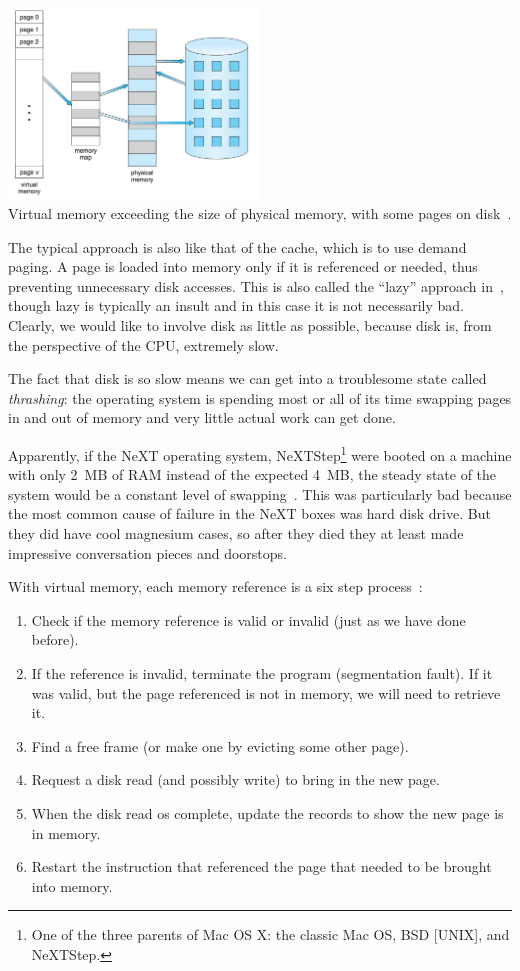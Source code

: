 \begin{center}
\includegraphics[width=0.5\textwidth]{images/vmem-physmem.png}\\
Virtual memory exceeding the size of physical memory, with some pages on disk~\cite{osc}.
\end{center}

The typical approach is also like that of the cache, which is to use demand paging. A page is loaded into memory only if it is referenced or needed, thus preventing unnecessary disk accesses. This is also called the ``lazy'' approach in~\cite{osc}, though lazy is typically an insult and in this case it is not necessarily bad.  Clearly, we would like to involve disk as little as possible, because disk is, from the perspective of the CPU, extremely slow.

The fact that disk is so slow means we can get into a troublesome state called \textit{thrashing}: the operating system is spending most or all of its time swapping pages in and out of memory and very little actual work can get done.

Apparently, if the NeXT operating system, NeXTStep\footnote{One of the three parents of Mac OS X: the classic Mac OS, BSD [UNIX], and NeXTStep.} were booted on a machine with only 2~MB of RAM instead of the expected 4~MB, the steady state of the system would be a constant level of swapping~\cite{mte241}. This was particularly bad because the most common cause of failure in the NeXT boxes was hard disk drive. But they did have cool magnesium cases, so after they died they at least made impressive conversation pieces and doorstops.

With virtual memory, each memory reference is a six step process~\cite{osc}:

\begin{enumerate}
	\item Check if the memory reference is valid or invalid (just as we have done before).
	\item If the reference is invalid, terminate the program (segmentation fault). If it was valid, but the page referenced is not in memory, we will need to retrieve it.
	\item Find a free frame (or make one by evicting some other page).
	\item Request a disk read (and possibly write) to bring in the new page.
	\item When the disk read os complete, update the records to show the new page is in memory.
	\item Restart the instruction that referenced the page that needed to be brought into memory.
\end{enumerate}


